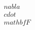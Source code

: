 \documentclass[preview]{standalone}
\begin{document}
\begin{align*}
\quad\\nabla \quad\\cdot \quad\\mathbf{F}
\end{align*}
\end{document}
